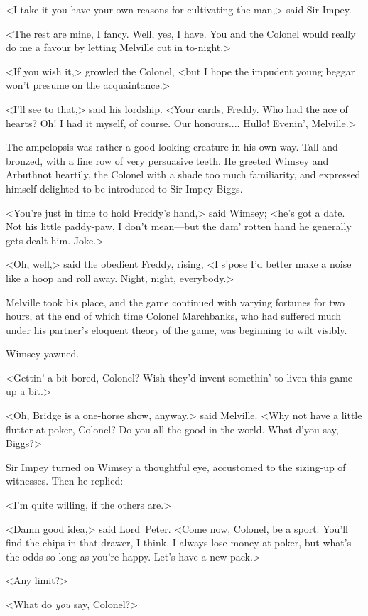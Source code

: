 <I take it you have your own reasons for cultivating the man,> said Sir Impey.

<The rest are mine, I fancy. Well, yes, I have. You and the Colonel would really do me a favour by letting Melville cut in to-night.>

<If you wish it,> growled the Colonel, <but I hope the impudent young beggar won't presume on the acquaintance.>

<I'll see to that,> said his lordship. <Your cards, Freddy. Who had the ace of hearts? Oh! I had it myself, of course. Our honours.... Hullo! Evenin', Melville.>

The ampelopsis was rather a good-looking creature in his own way. Tall and bronzed, with a fine row of very persuasive teeth. He greeted Wimsey and Arbuthnot heartily, the Colonel with a shade too much familiarity, and expressed himself delighted to be introduced to Sir Impey Biggs.

<You're just in time to hold Freddy's hand,> said Wimsey; <he's got a date. Not his little paddy-paw, I don't mean—but the dam' rotten hand he generally gets dealt him. Joke.>

<Oh, well,> said the obedient Freddy, rising, <I s'pose I'd better make a noise like a hoop and roll away. Night, night, everybody.>

Melville took his place, and the game continued with varying fortunes for two hours, at the end of which time Colonel Marchbanks, who had suffered much under his partner's eloquent theory of the game, was beginning to wilt visibly.

Wimsey yawned.

<Gettin' a bit bored, Colonel? Wish they'd invent somethin' to liven this game up a bit.>

<Oh, Bridge is a one-horse show, anyway,> said Melville. <Why not have a little flutter at poker, Colonel? Do you all the good in the world. What d'you say, Biggs?>

Sir Impey turned on Wimsey a thoughtful eye, accustomed to the sizing-up of witnesses. Then he replied:

<I'm quite willing, if the others are.>

<Damn good idea,> said Lord~Peter. <Come now, Colonel, be a sport. You'll find the chips in that drawer, I think. I always lose money at poker, but what's the odds so long as you're happy. Let's have a new pack.>

<Any limit?>

<What do \emph{you} say, Colonel?>

